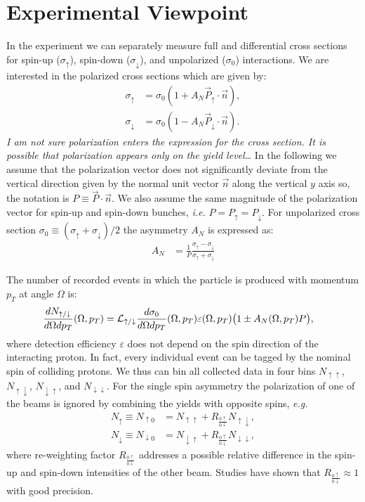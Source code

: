 \documentclass[12pt]{article}
\begin{document}
\section{Experimental Viewpoint}

In the experiment we can separately measure full and differential cross sections
for spin-up ($\sigma_\uparrow$), spin-down ($\sigma_\downarrow$), and
unpolarized ($\sigma_0$) interactions. We are interested in the polarized cross
sections which are given by:
%
\begin{align}
\sigma_\uparrow   &= \sigma_0 (1 + A_N \vec{P}_\uparrow \cdot \vec{n}), \\
\sigma_\downarrow &= \sigma_0 (1 - A_N \vec{P}_\downarrow \cdot \vec{n}).
\end{align}
%
\textit{I am not sure polarization enters the expression for the cross section.
It is possible that polarization appears only on the yield level\ldots}
%
In the following we assume that the polarization vector does not significantly
deviate from the vertical direction given by the normal unit vector $\vec n$
along the vertical $y$ axis so, the notation is $P \equiv \vec{P} \cdot
\vec{n}$. We also assume the same magnitude of the polarization vector for
spin-up and spin-down bunches, \textit{i.e.} $P = P_\uparrow = P_\downarrow$.
For unpolarized cross section $\sigma_0 \equiv (\sigma_\uparrow +
\sigma_\downarrow)/2$ the asymmetry $A_N$ is expressed as:
%
\begin{align}
\label{eq_anapower}
A_N &= \frac{1}{P} \frac{\sigma_\uparrow - \sigma_\downarrow}{\sigma_\uparrow +
   \sigma_\downarrow}
\end{align}

The number of recorded events in which the particle is produced with momentum
$p_T$ at angle $\Omega$ is:
%
\begin{align}
\frac{dN_{\uparrow/\downarrow}}{d\Omega dp_T}(\Omega, p_T) &=
   {\cal L}_{\uparrow/\downarrow} \frac{d\sigma_0}{d\Omega dp_T}(\Omega, p_T)
   \varepsilon(\Omega, p_T) \big( 1 \pm A_N(\Omega, p_T) P \big),
\label{eq:yield_diff}
\end{align}
%
where detection efficiency $\varepsilon$ does not depend on the spin direction
of the interacting proton. In fact, every individual event can be tagged by the
nominal spin of colliding protons. We thus can bin all collected data  in four
bins $N_{\uparrow\uparrow}$, $N_{\uparrow\downarrow}$, $N_{\downarrow\uparrow}$,
and $N_{\downarrow\downarrow}$. For the single spin asymmetry the polarization
of one of the beams is ignored by combining the yields with opposite spins,
\textit{e.g.}
%
\begin{align}
N_{\uparrow}   \equiv N_{\uparrow0}   &= N_{\uparrow\uparrow}   + R_{\frac{0\uparrow}{0\downarrow}} N_{\uparrow\downarrow},\\
N_{\downarrow} \equiv N_{\downarrow0} &= N_{\downarrow\uparrow} + R_{\frac{0\uparrow}{0\downarrow}} N_{\downarrow\downarrow},
\end{align}
%
where re-weighting factor $R_{\frac{0\uparrow}{0\downarrow}}$ addresses a
possible relative difference in the spin-up and spin-down intensities of the
other beam. Studies have shown that $R_{\frac{0\uparrow}{0\downarrow}} \approx
1$ with good precision.
\end{document}
